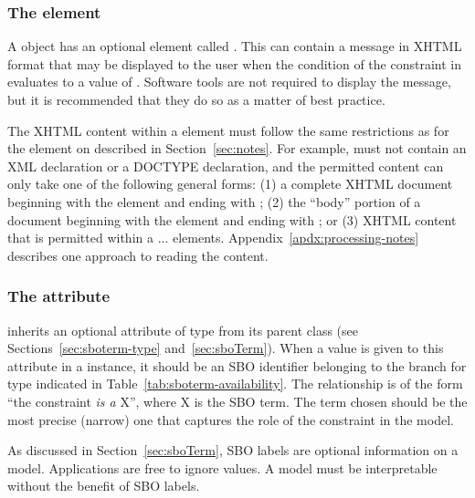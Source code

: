 \subsubsection{The  element}
\label{sec:constraint-message}

A \Constraint object has an optional element called
.  This can contain a message in XHTML format that
may be displayed to the user when the condition of the constraint
in  evaluates to a value of .  Software
tools are not required to display the message, but it is
recommended that they do so as a matter of best practice.

The XHTML content within a  element must follow the
same restrictions as for the  element on \SBase
described in Section~\ref{sec:notes}.  For example,
 must not contain an XML declaration or a DOCTYPE
declaration, and the permitted content can only take one of the
following general forms: (1) a complete XHTML document beginning
with the element  and ending with ;
(2) the ``body'' portion of a document beginning with the element
 and ending with ; or (3) XHTML
content that is permitted within a  ...
 elements.    Appendix~\ref{apdx:processing-notes}
describes one approach to reading the  content.


\subsubsection{The  attribute}
\label{sec:constraint-sboterm}

\Constraint inherits an optional 
attribute of type  from its parent
class \SBase (see Sections~\ref{sec:sboterm-type}
and~\ref{sec:sboTerm}).  When a value is given to this
attribute in a  \Constraint instance, it should be an
SBO identifier belonging to the branch for type  \Constraint
indicated in Table~\ref{tab:sboterm-availability}.  The relationship is
of the form ``the constraint \emph{is a} X'', where X is
the SBO term.  The term chosen should be the most precise (narrow)
one that captures the role of the constraint in the model.

As discussed in Section~\ref{sec:sboTerm}, SBO labels are optional
information on a model.  Applications are free to ignore
 values.  A model must be interpretable without the
benefit of SBO labels.


